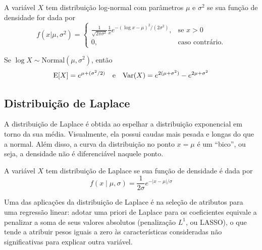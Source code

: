 \begin{def:lognormal}
A variável $X$ tem distribuição log-normal com parâmetros $\mu$ e $\sigma^2$ se
sua função de densidade for dada por
\[
    f(x | \mu, \sigma^2) = \begin{cases}
        \frac{1}{\sqrt{2\pi\sigma^2}} \frac 1 x e^{-(\log x - \mu)^2/(2\sigma^2)},&\text{se } x > 0 \\
        0,&\text{caso contrário.}
    \end{cases}
\]
\end{def:lognormal}

\begin{prop:lognormal}
Se $\log X \sim \mathrm{Normal}(\mu, \sigma^2)$, então
\[
    \mathrm{E}\!\left[X\right] = e^{\mu + (\sigma^2/2)} \quad \text{e} \quad \mathrm{Var}\!\left(X\right) = e^{2(\mu+\sigma^2)} - e^{2\mu + \sigma^2}
\]
\end{prop:lognormal}

\subsection{Distribuição de Laplace}

A distribuição de Laplace é obtida ao espelhar a distribuição exponencial em torno da
sua média.
Visualmente, ela possui caudas mais pesada e longas do que a normal.
Além disso, a curva da distribuição no ponto $x = \mu$ é um ``bico'', ou seja, a
densidade não é diferenciável naquele ponto.

\begin{def:laplace}
A variável $X$ tem distribuição de Laplace se sua função de densidade é dada por
\[
    f(x \mid \mu, \sigma) = \frac{1}{2\sigma} e^{-|x - \mu|/\sigma}
\]
\end{def:laplace}

Uma das aplicações da distribuição de Laplace é na seleção de atributos para uma
regressão linear: adotar uma priori de Laplace para os coeficientes equivale a penalizar
a soma de seus valores absolutos (penalização $L^1$, ou LASSO), o que tende a atribuir
pesos iguais a zero às características consideradas não significativas para explicar
outra variável.
